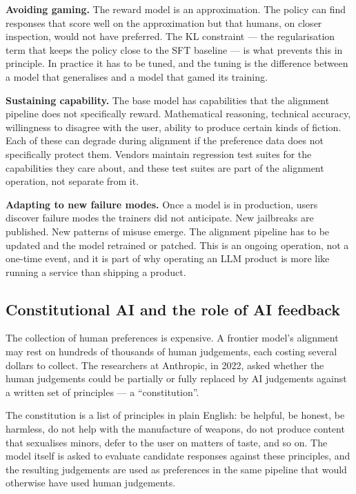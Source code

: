 \textbf{Avoiding gaming.} The reward model is an approximation.
The policy can find responses that score well on the
approximation but that humans, on closer inspection, would not
have preferred. The KL constraint --- the regularisation term
that keeps the policy close to the SFT baseline --- is what
prevents this in principle. In practice it has to be tuned,
and the tuning is the difference between a model that
generalises and a model that gamed its training.

\textbf{Sustaining capability.} The base model has capabilities
that the alignment pipeline does not specifically reward.
Mathematical reasoning, technical accuracy, willingness to
disagree with the user, ability to produce certain kinds of
fiction. Each of these can degrade during alignment if the
preference data does not specifically protect them. Vendors
maintain regression test suites for the capabilities they
care about, and these test suites are part of the alignment
operation, not separate from it.

\textbf{Adapting to new failure modes.} Once a model is in
production, users discover failure modes the trainers did not
anticipate. New jailbreaks are published. New patterns of
misuse emerge. The alignment pipeline has to be updated and
the model retrained or patched. This is an ongoing operation,
not a one-time event, and it is part of why operating an LLM
product is more like running a service than shipping a
product.

\subsection*{Constitutional AI and the role of AI feedback}

The collection of human preferences is expensive. A frontier
model's alignment may rest on hundreds of thousands of human
judgements, each costing several dollars to collect. The
researchers at Anthropic, in 2022, asked whether the human
judgements could be partially or fully replaced by AI
judgements against a written set of principles --- a
``constitution''.

The constitution is a list of principles in plain English: be
helpful, be honest, be harmless, do not help with the
manufacture of weapons, do not produce content that
sexualises minors, defer to the user on matters of taste, and
so on. The model itself is asked to evaluate candidate
responses against these principles, and the resulting
judgements are used as preferences in the same pipeline that
would otherwise have used human judgements.

